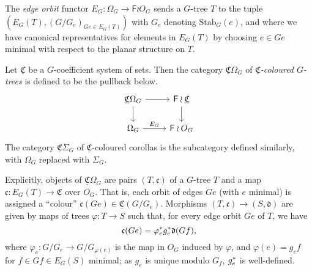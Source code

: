 \documentclass[a4paper,10pt
,draft
]{article}%
\renewcommand{\phi}{\varphi}
\begin{document}
\newcommand{\CS}{\underline{\mathfrak C} \Sigma_G}
\newcommand{\CO}{\underline{\mathfrak C} \Omega_G}


\begin{definition}
      The \textit{edge orbit} functor $E_G: \Omega_G \to \mathsf F \wr O_G$ sends a $G$-tree $T$ to the tuple $(E_G(T), (G/G_e)_{Ge \in E_G(T)})$
      with $G_e$ denoting $\mathrm{Stab}_G(e)$, and
      where we have canonical representatives for elements in $E_G(T)$ by choosing
      $e \in Ge$ minimal with respect to the planar structure on $T$.
\end{definition}

\begin{definition}
      Let $\underline{\mathfrak C}$ be a $G$-coefficient system of sets.
      Then the category $\underline{\mathfrak C}\Omega_G$ of \textit{$\underline{\mathfrak C}$-coloured $G$-trees}
      is defined to be the pullback below.
      \begin{equation}
            \label{COMEGA_G_EQ}
            \begin{tikzcd}
                  \CO \arrow[d] \arrow[r]
                  &
                  \mathsf F \wr \underline{\mathfrak C} \arrow[d]
                  \\
                  \Omega_G \arrow[r, "E_G"]
                  &
                  \mathsf F \wr O_G
            \end{tikzcd}
      \end{equation}
      The category $\CS$ of $\underline{\mathfrak C}$-coloured corollas is the subcategory defined similarly,
      with $\Omega_G$ replaced with $\Sigma_G$.
\end{definition}


Explicitly, objects of $\CO$ are pairs $(T, \mathfrak c)$ of
a $G$-tree $T$ and
a map $\mathfrak c: E_G(T) \to \underline{\mathfrak C}$ over $O_G$.
That is, each orbit of edges $Ge$ (with $e$ minimal)
is assigned a ``colour'' $\mathfrak c(Ge) \in \underline{\mathfrak C}(G/G_{e})$.
Morphisms $(T, \mathfrak c) \to (S, \mathfrak d)$
are given by maps of trees $\phi: T \to S$ such that, for every edge orbit $Ge$ of $T$, we have
\begin{equation}
      \mathfrak c(Ge) = \phi_{e}^{\**}g_e^{\**}\mathfrak d(Gf),
\end{equation}
where $\phi_{e}: G / G_{e} \to G / G_{\phi(e)}$ is the map in $O_G$ induced by $\phi$,
and $\phi(e) = g_e f$ for $f \in Gf \in E_G(S)$ minimal; as $g_e$ is unique modulo $G_f$, $g_e^{\**}$ is well-defined.
\end{document}
